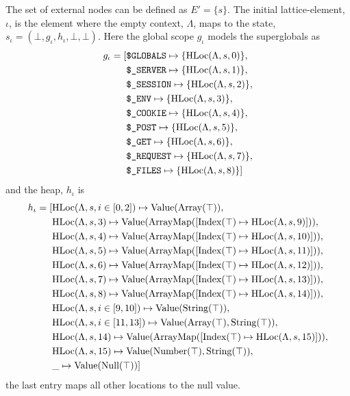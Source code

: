 The set of external nodes can be defined as $E' = \{s\}$. The initial lattice-element, $\iota$, is the element where the empty context, $\Lambda$, maps to the state, $s_\iota = (\bot, g_\iota, h_\iota, \bot, \bot)$. Here the global scope $g_\iota$ models the superglobals as
\begin{align*}
g_\iota = 	[&\texttt{\$GLOBALS}\mapsto \{\text{HLoc}(\Lambda, s, 0)\},\notag\\
			 &\texttt{\$\_SERVER}\mapsto \{\text{HLoc}(\Lambda, s, 1)\},\notag\\
			 &\texttt{\$\_SESSION}\mapsto \{\text{HLoc}(\Lambda, s, 2)\},\notag\\
			 &\texttt{\$\_ENV}\mapsto \{\text{HLoc}(\Lambda, s, 3)\},\notag\\
			 &\texttt{\$\_COOKIE}\mapsto \{\text{HLoc}(\Lambda, s, 4)\},\notag\\
			 &\texttt{\$\_POST}\mapsto \{\text{HLoc}(\Lambda, s, 5)\},\notag\\
			 &\texttt{\$\_GET}\mapsto \{\text{HLoc}(\Lambda, s, 6)\},\notag\\
			 &\texttt{\$\_REQUEST}\mapsto \{\text{HLoc}(\Lambda, s, 7)\}, \notag\\
			 &\texttt{\$\_FILES}\mapsto \{\text{HLoc}(\Lambda, s, 8)\}]
\end{align*} 
and the heap, $h_\iota$ is
\begin{align*}
h_\iota = [	&\text{HLoc}(\Lambda, s, i\in[0,2])\mapsto \text{Value}(\text{Array}(\top)),\notag\\
			&\text{HLoc}(\Lambda, s, 3)\mapsto \text{Value}(\text{ArrayMap}([\text{Index}(\top)\mapsto\text{HLoc}(\Lambda, s, 9)])),\notag\\
			&\text{HLoc}(\Lambda, s, 4)\mapsto \text{Value}(\text{ArrayMap}([\text{Index}(\top)\mapsto\text{HLoc}(\Lambda, s, 10)])),\notag\\
			&\text{HLoc}(\Lambda, s, 5)\mapsto \text{Value}(\text{ArrayMap}([\text{Index}(\top)\mapsto\text{HLoc}(\Lambda, s, 11)])),\notag\\			
			&\text{HLoc}(\Lambda, s, 6)\mapsto \text{Value}(\text{ArrayMap}([\text{Index}(\top)\mapsto\text{HLoc}(\Lambda, s, 12)])),\notag\\			
			&\text{HLoc}(\Lambda, s, 7)\mapsto \text{Value}(\text{ArrayMap}([\text{Index}(\top)\mapsto\text{HLoc}(\Lambda, s, 13)])),\notag\\			
			&\text{HLoc}(\Lambda, s, 8)\mapsto \text{Value}(\text{ArrayMap}([\text{Index}(\top)\mapsto\text{HLoc}(\Lambda, s, 14)])),\notag\\			
			&\text{HLoc}(\Lambda, s, i \in [9, 10])\mapsto \text{Value}(\text{String}(\top)),\notag\\
			&\text{HLoc}(\Lambda, s, i\in[11,13])\mapsto \text{Value}(\text{Array}(\top),\text{String}(\top)),\notag\\
			&\text{HLoc}(\Lambda, s, 14)\mapsto \text{Value}(\text{ArrayMap}([\text{Index}(\top)\mapsto\text{HLoc}(\Lambda, s, 15)])),\notag\\			
			&\text{HLoc}(\Lambda, s, 15)\mapsto \text{Value}(\text{Number}(\top),\text{String}(\top)),\notag\\
			&\_ \mapsto \text{Value}(\text{Null}(\top))]
\end{align*}
the last entry maps all other locations to the null value. 


